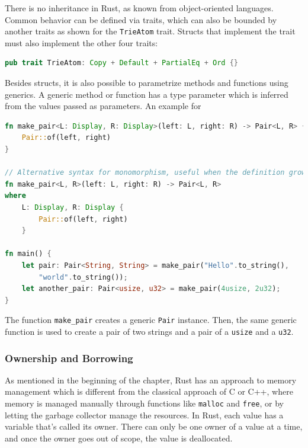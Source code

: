 \documentclass{article}
\begin{document}
There is no inheritance in Rust, as known from object-oriented languages. Common behavior can be defined via traits, which can also be bounded by another traits as shown for the \lstinline{TrieAtom} trait. Structs that implement the trait must also implement the other four traits:
\begin{lstlisting}[language=Rust, style=boxed, caption=An example trait from the \textit{trying} crate which we evaluate the approach on, label=lst:trying-trait-bounding]
pub trait TrieAtom: Copy + Default + PartialEq + Ord {}
\end{lstlisting}

Besides structs, it is also possible to parametrize methods and functions using generics. A generic method or function has a type parameter which is inferred from the values passed as parameters. An example for
\begin{lstlisting}[language=Rust, style=boxed, caption=Variants of defining a generic function, label=lst:function-monomorphization]
fn make_pair<L: Display, R: Display>(left: L, right: R) -> Pair<L, R> {
    Pair::of(left, right)
}

// Alternative syntax for monomorphism, useful when the definition grows large
fn make_pair<L, R>(left: L, right: R) -> Pair<L, R>
where
    L: Display, R: Display {
        Pair::of(left, right)
    }

fn main() {
    let pair: Pair<String, String> = make_pair("Hello".to_string(), 
        "world".to_string());
    let another_pair: Pair<usize, u32> = make_pair(4usize, 2u32);
}
\end{lstlisting}

The function \lstinline{make_pair} creates a generic \lstinline{Pair} instance. Then, the same generic function is used to create a pair of two strings and a pair of a \lstinline{usize} and a \lstinline{u32}.

\subsubsection{Ownership and Borrowing}
As mentioned in the beginning of the chapter, Rust has an approach to memory management which is different from the classical approach of C or C++, where memory is managed manually through functions like \lstinline{malloc} and \lstinline{free}, or by letting the garbage collector manage the resources. In Rust, each value has a variable that's called its owner. There can only be one owner of a value at a time, and once the owner goes out of scope, the value is deallocated.
\end{document}
